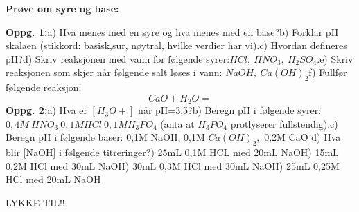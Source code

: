 \documentclass{minmal}
\begin{document}
 \begin{center}
    \textbf{Prøve om syre og base:}
\end{center}
\textbf{Oppg. 1:}\nl[1]
a) Hva menes med en syre og hva menes med en base?\nl[1]
b) Forklar pH skalaen (stikkord: basisk,sur, nøytral, hvilke verdier har vi).\nl[1]
c) Hvordan defineres pH?\nl[1]
d) Skriv reaksjonen med vann for følgende syrer:$HCl,\ HNO_3,\ H_2SO_4$.\nl[1]
e) Skriv reaksjonen som skjer når følgende salt løses i vann: $NaOH,\ Ca(OH)_2$\nl[1]
f) Fullfør følgende reaksjon:\nl[1]
$$CaO + H_2O =$$\nl[1]
\textbf{Oppg. 2:}\nl[1]
a) Hva er $[H_3O+]$ når pH=3,5?\nl[1]
b) Beregn pH i følgende syrer: $0,4M\ HNO_3\ 0,1M HCl\ 0,1M H_3PO_4$
(anta at $H_3PO_4$ protlyserer fullstendig).\nl[1]
c) Beregn pH i følgende baser: 0,1M NaOH, 0,1M $Ca(OH)_2$,\ 0,2M CaO\newpage
d) Hva blir [NaOH] i følgende titreringer?) 25mL 0,1M HCL med 20mL NaOH) 15mL 0,2M HCl med 30mL NaOH) 30mL 0,3M HCl med 30mL NaOH) 25mL 0,25M HCl med 20mL NaOH\nl[1]
\ifluatex
\begin{center}
 LYKKE TIL!!
\end{center}
\fi
\ptable
\end{document}
